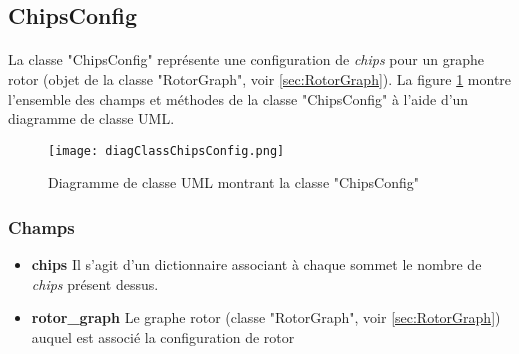 \documentclass{article}
\begin{document}
	\subsection{ChipsConfig}
	\paragraph*{}
	La classe "ChipsConfig" représente une configuration de \textit{chips} pour un graphe rotor (objet de la classe "RotorGraph", voir \ref{sec:RotorGraph}). La figure \ref{fig:diagClassChipsConfig} montre l'ensemble des champs et méthodes de la classe "ChipsConfig" à l'aide d'un diagramme de classe UML.
	
	\begin{figure}[h]
		\texttt{[image: diagClassChipsConfig.png]}
		\centering
		\caption{Diagramme de classe UML montrant la classe "ChipsConfig"}
		\label{fig:diagClassChipsConfig}
	\end{figure}

	\subsubsection{Champs}
	\begin{itemize}
		\item \textbf{chips}\newline
		Il s'agit d'un dictionnaire associant à chaque sommet le nombre de \textit{chips} présent dessus.
		\item \textbf{rotor\_graph}\newline
		Le graphe rotor (classe "RotorGraph", voir \ref{sec:RotorGraph}) auquel est associé la configuration de rotor
	\end{itemize}
\end{document}

